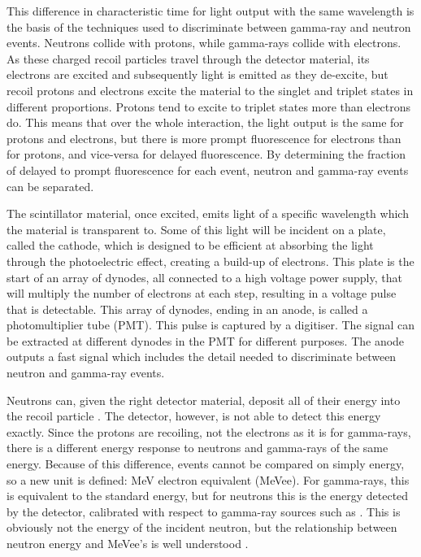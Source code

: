 \documentclass[11pt]{article}
\numberwithin{equation}{section}
\numberwithin{figure}{section}
\numberwithin{table}{section}
\begin{document}
\par This difference in characteristic time for light output with the same wavelength is the basis of the techniques used to discriminate between gamma-ray and neutron events. Neutrons collide with protons, while gamma-rays collide with electrons. As these charged recoil particles travel through the detector material, its electrons are excited and subsequently light is emitted as they de-excite, but recoil protons and electrons excite the material to the singlet and triplet states in different proportions. Protons tend to excite to triplet states more than electrons do. This means that over the whole interaction, the light output is the same for protons and electrons, but there is more prompt fluorescence for electrons than for protons, and vice-versa for delayed fluorescence. By determining the fraction of delayed to prompt fluorescence for each event, neutron and gamma-ray events can be separated.
\newline
\par The scintillator material, once excited, emits light of a specific wavelength which the material is transparent to. Some of this light will be incident on a plate, called the cathode, which is designed to be efficient at absorbing the light through the photoelectric effect, creating a build-up of electrons. This plate is the start of an array of dynodes, all connected to a high voltage power supply, that will multiply the number of electrons at each step, resulting in a voltage pulse that is detectable. This array of dynodes, ending in an anode, is called a photomultiplier tube (PMT). This pulse is captured by a digitiser. The signal can be extracted at different dynodes in the PMT for different purposes. The anode outputs a fast signal which includes the detail needed to discriminate between neutron and gamma-ray events.
\newline
\par Neutrons can, given the right detector material, deposit all of their energy into the recoil particle \cite{Knoll}. The detector, however, is not able to detect this energy exactly. Since the protons are recoiling, not the electrons as it is for gamma-rays, there is a different energy response to neutrons and gamma-rays of the same energy. Because of this difference, events cannot be compared on simply energy, so a new unit is defined: MeV electron equivalent (MeVee). For gamma-rays, this is equivalent to the standard energy, but for neutrons this is the energy detected by the detector, calibrated with respect to gamma-ray sources such as . This is obviously not the energy of the incident neutron, but the relationship between neutron energy and MeVee's is well understood \cite{Mevee}. 
\end{document}
